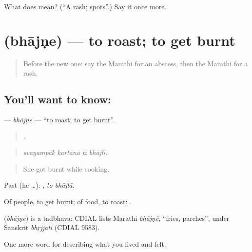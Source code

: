\begin{tcolorbox}[breakable,colback=teal!4,colframe=teal!35!black,title={Before you move on}]
What does  mean? (\textquotedblleft{}A rash; spots\textquotedblright{}.) Say it once more.
\end{tcolorbox}
\section[\texorpdfstring{\mr{भाजणे} (bhājṇe)}{भाजणे (bhājṇe)}]{ (bhājṇe) — to roast; to get burnt}

\label{lesson:MR-C487-bhajne}



\begin{quote}
Before the new one: say the Marathi for an abscess, then the Marathi for a rash.
\end{quote}

\subsection*{You'll want to know: }
\textbf{} — \emph{bhājṇe} — \textquotedblleft{}to roast; to get burnt\textquotedblright{}.

\begin{quote}
   .
\end{quote}

\begin{quote}
\emph{svayampāk kartānā tī bhājlī.}
\end{quote}

\begin{quote}
She got burnt while cooking.
\end{quote}

Past (he …):  , \emph{to bhājlā}.

Of people, to get burnt; of food, to roast:  .

\begin{cousinweb}
\textbf{} (\emph{bhājṇe}) is a tadbhava: CDIAL lists Marathi \emph{bhājṇẽ}, \textquotedblleft{}fries, parches\textquotedblright{}, under Sanskrit \emph{bhṛjjati} (CDIAL 9583).
\end{cousinweb}

\begin{grammarlens}[title={What you've built}]
One more word for describing what you lived and felt.
\end{grammarlens}

